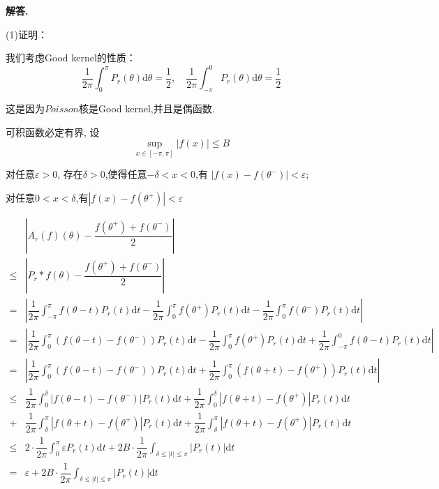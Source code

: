 \documentclass[12pt, a4paper, oneside]{ctexart}
\newenvironment{solution}{\par\noindent\textbf{解答. }}{\par}
\begin{document}
\begin{solution}
\par
(1)证明：
\par
我们考虑Good kernel的性质：
$$
\dfrac{1}{2\pi}\int_{0}^{\pi}P_r(\theta)\mathrm{d}\theta=\dfrac{1}{2}, 
\quad\dfrac{1}{2\pi}\int_{-\pi}^{0}P_r(\theta)\mathrm{d}\theta=\dfrac{1}{2}
$$
\par
这是因为$Poisson$核是Good kernel,并且是偶函数.
\par
可积函数必定有界, 设
$$
\sup_{x\in[-\pi,\pi]}|f(x)|\leqslant B
$$
\par
对任意$\varepsilon>0$, 存在$\delta>0$,使得任意$-\delta<x<0$,有
$|f(x)-f(\theta^-)|<\varepsilon$;
\par
对任意$0<x<\delta$,有$|f(x)-f(\theta^+)|<\varepsilon$
\par
$$
\begin{aligned}
&\left|A_r(f)(\theta)-\dfrac{f(\theta^+)+f(\theta^-)}{2}\right|\\
\leqslant&\left|P_r*f(\theta)-\dfrac{f(\theta^+)+f(\theta^-)}{2}\right|\\
=&\left|
\dfrac{1}{2\pi}\int_{-\pi}^{\pi}f(\theta-t)P_r(t)\mathrm{d}t
-\dfrac{1}{2\pi}\int_{0}^{\pi}f(\theta^+)P_r(t)\mathrm{d}t
-\dfrac{1}{2\pi}\int_{0}^{\pi}f(\theta^-)P_r(t)\mathrm{d}t
\right|\\
=&\left|
\dfrac{1}{2\pi}\int_{0}^{\pi}(f(\theta-t)-f(\theta ^-))P_r(t)\mathrm{d}t
-\dfrac{1}{2\pi}\int_{0}^{\pi}f(\theta^+)P_r(t)\mathrm{d}t
+\dfrac{1}{2\pi}\int_{-\pi}^{0}f(\theta-t)P_r(t)\mathrm{d}t\right|\\
=&\left|\dfrac{1}{2\pi}\int_{0}^{\pi}(f(\theta-t)-f(\theta ^-))P_r(t)\mathrm{d}t
+\dfrac{1}{2\pi}\int_{0}^{\pi}(f(\theta+t)-f(\theta ^+))P_r(t)\mathrm{d}t\right|\\
\leqslant&\dfrac{1}{2\pi}\int_{0}^{\delta}|f(\theta-t)-f(\theta^-)|P_r(t)\mathrm{d}t
+\dfrac{1}{2\pi}\int_{0}^{\delta}|f(\theta+t)-f(\theta^+)|P_r(t)\mathrm{d}t\\
+&\dfrac{1}{2\pi}\int_{\delta}^{\pi}|f(\theta+t)-f(\theta^+)|P_r(t)\mathrm{d}t
+\dfrac{1}{2\pi}\int_{\delta}^{\pi}|f(\theta+t)-f(\theta^+)|P_r(t)\mathrm{d}t\\
\leqslant&2\cdot\dfrac{1}{2\pi}\int_{0}^{\pi}\varepsilon P_r(t)\mathrm{d}t
+2B\cdot \dfrac{1}{2\pi}\int_{\delta \leqslant |t| \leqslant \pi}|P_r(t)|\mathrm{d}t\\
=&\varepsilon+2B\cdot \dfrac{1}{2\pi}\int_{\delta \leqslant |t| \leqslant \pi}|P_r(t)|\mathrm{d}t
\end{aligned}
$$
\par

\end{solution}
\end{document}
